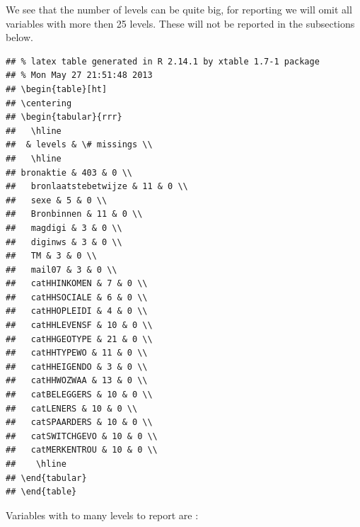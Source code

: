 \documentclass[10pt,a4paper,titlepage]{report}
\begin{document}
We see that the number of levels can be quite big, for reporting we will omit all variables with more then  25 levels. These will not be reported in the subsections below.
\begin{knitrout}
\color{fgcolor}\begin{kframe}
\begin{verbatim}
## % latex table generated in R 2.14.1 by xtable 1.7-1 package
## % Mon May 27 21:51:48 2013
## \begin{table}[ht]
## \centering
## \begin{tabular}{rrr}
##   \hline
##  & levels & \# missings \\ 
##   \hline
## bronaktie & 403 & 0 \\ 
##   bronlaatstebetwijze & 11 & 0 \\ 
##   sexe & 5 & 0 \\ 
##   Bronbinnen & 11 & 0 \\ 
##   magdigi & 3 & 0 \\ 
##   diginws & 3 & 0 \\ 
##   TM & 3 & 0 \\ 
##   mail07 & 3 & 0 \\ 
##   catHHINKOMEN & 7 & 0 \\ 
##   catHHSOCIALE & 6 & 0 \\ 
##   catHHOPLEIDI & 4 & 0 \\ 
##   catHHLEVENSF & 10 & 0 \\ 
##   catHHGEOTYPE & 21 & 0 \\ 
##   catHHTYPEWO & 11 & 0 \\ 
##   catHHEIGENDO & 3 & 0 \\ 
##   catHHWOZWAA & 13 & 0 \\ 
##   catBELEGGERS & 10 & 0 \\ 
##   catLENERS & 10 & 0 \\ 
##   catSPAARDERS & 10 & 0 \\ 
##   catSWITCHGEVO & 10 & 0 \\ 
##   catMERKENTROU & 10 & 0 \\ 
##    \hline
## \end{tabular}
## \end{table}
\end{verbatim}
\end{kframe}
\end{knitrout}


Variables with to many levels to report are : 
\end{document}
